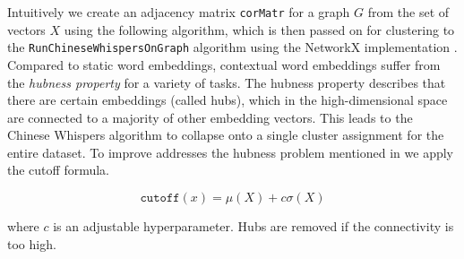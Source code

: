 \documentclass[a4paper,12pt,oneside,openright]{report}
\begin{document}
\hfill \break

Intuitively we create an adjacency matrix \texttt{corMatr} for a graph $G$ from the set of vectors $X$ using the following algorithm, which is then passed on for clustering to the \texttt{RunChineseWhispersOnGraph} algorithm using the NetworkX implementation \cite{hagberg04}.
Compared to static word embeddings, contextual word embeddings suffer from the \textit{hubness property} \cite{conneau17} for a variety of tasks.
The hubness property describes that there are certain embeddings (called hubs), which in the high-dimensional space are connected to a majority of other embedding vectors.
This leads to the Chinese Whispers algorithm to collapse onto a single cluster assignment for the entire dataset.
To improve addresses the hubness problem mentioned in \cite{conneau17} we apply the cutoff formula.

\begin{equation}
\texttt{cutoff}(x) = \mu ( X ) + c \sigma (X)
\end{equation}

where $c$ is an adjustable hyperparameter.
Hubs are removed if the connectivity is too high. \\
\end{document}
